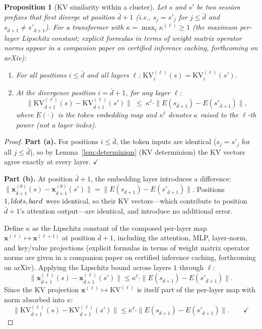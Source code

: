 \documentclass[11pt]{article}
\newtheorem{proposition}{Proposition}
\begin{document}
\begin{proposition}[KV similarity within a cluster]
\label{prop:kv_similarity}
Let $s$ and $s'$ be two session prefixes that first diverge at position $\bar{d}+1$
(i.e., $s_j = s'_j$ for $j \leq \bar{d}$ and $s_{\bar{d}+1} \neq s'_{\bar{d}+1}$).  For a
transformer with $\kappa = \max_\ell \kappa^{(\ell)} \geq 1$ (the maximum per-layer Lipschitz constant; explicit formulas in terms of weight matrix operator norms appear in a companion paper on certified inference caching, forthcoming on arXiv):
\begin{enumerate}[leftmargin=2em,label=(\alph*)]
  \item For all positions $i \leq \bar{d}$ and all layers $\ell$:
        $\mathrm{KV}^{(\ell)}_i(s) = \mathrm{KV}^{(\ell)}_i(s')$.
  \item At the divergence position $i = \bar{d}+1$, for any layer $\ell$:
        \[
          \bigl\|\mathrm{KV}^{(\ell)}_{\bar{d}+1}(s) - \mathrm{KV}^{(\ell)}_{\bar{d}+1}(s')\bigr\|
          \;\leq\; \kappa^\ell \cdot \|E(s_{\bar{d}+1}) - E(s'_{\bar{d}+1})\|,
        \]
        where $E(\cdot)$ is the token embedding map and $\kappa^\ell$ denotes $\kappa$
        raised to the $\ell$-th power (not a layer index).
\end{enumerate}
\end{proposition}

\begin{proof}
\textbf{Part (a).}  For positions $i \leq \bar{d}$, the token inputs are identical
($s_j = s'_j$ for all $j \leq \bar{d}$), so by Lemma~\ref{lem:determinism} (KV
determinism) the KV vectors agree exactly at every layer. $\checkmark$

\textbf{Part (b).}  At position $\bar{d}+1$, the embedding layer introduces a difference:
$\|\mathbf{x}^{(0)}_{\bar{d}+1}(s) - \mathbf{x}^{(0)}_{\bar{d}+1}(s')\| = \|E(s_{\bar{d}+1}) - E(s'_{\bar{d}+1})\|$.
Positions $1,\\ldots,\\bar{d}$ were identical, so their KV vectors---which contribute to
position $\bar{d}+1$'s attention output---are identical, and introduce no additional
error.

Define $\kappa$ as the Lipschitz constant of the composed per-layer map
$\mathbf{x}^{(\ell)} \mapsto \mathbf{x}^{(\ell+1)}$ at position $\bar{d}+1$,
including the attention, MLP, layer-norm, and key/value projections
(explicit formulas in terms of weight matrix
operator norms are given in a companion paper on certified inference caching, forthcoming on arXiv).  Applying the Lipschitz bound across layers $1$ through $\ell$:
\[
  \|\mathbf{x}^{(\ell)}_{\bar{d}+1}(s) - \mathbf{x}^{(\ell)}_{\bar{d}+1}(s')\|
  \leq \kappa^\ell \cdot \|E(s_{\bar{d}+1}) - E(s'_{\bar{d}+1})\|.
\]
Since the KV projection $\mathbf{x}^{(\ell)} \mapsto \mathrm{KV}^{(\ell)}$ is
itself part of the per-layer map with norm absorbed into $\kappa$:
\[
  \|\mathrm{KV}^{(\ell)}_{\bar{d}+1}(s) - \mathrm{KV}^{(\ell)}_{\bar{d}+1}(s')\|
  \leq \kappa^\ell \cdot \|E(s_{\bar{d}+1}) - E(s'_{\bar{d}+1})\|. \qquad\checkmark
\]
\end{proof}
\end{document}
